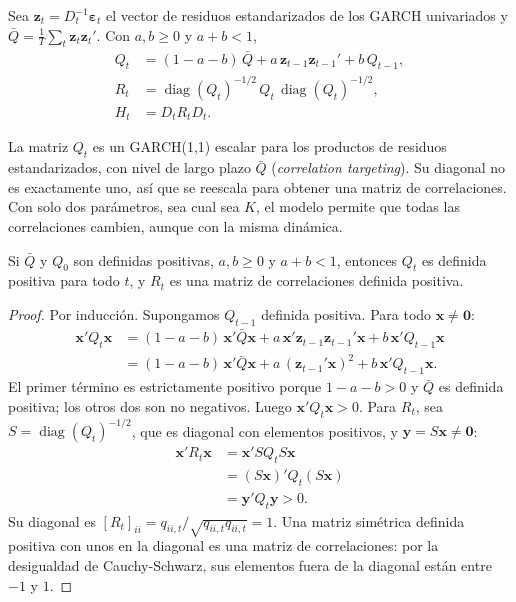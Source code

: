 \begin{definicion}
Sea $\mathbf z_t=D_t^{-1}\boldsymbol\varepsilon_t$ el vector de residuos estandarizados de los GARCH univariados
y $\bar Q=\frac1T\sum_t\mathbf z_t\mathbf z_t'$. Con $a,b\ge0$ y $a+b<1$,
\begin{align*}
  Q_t &= (1-a-b)\,\bar Q+a\,\mathbf z_{t-1}\mathbf z_{t-1}'+b\,Q_{t-1},\\
  R_t &= \operatorname{diag}(Q_t)^{-1/2}\,Q_t\,\operatorname{diag}(Q_t)^{-1/2},\\
  H_t &= D_tR_tD_t .
\end{align*}
\end{definicion}

La matriz $Q_t$ es un GARCH(1,1) escalar para los productos de residuos estandarizados, con nivel de largo plazo
$\bar Q$ (\emph{correlation targeting}). Su diagonal no es exactamente uno, así que se reescala para obtener una
matriz de correlaciones. Con solo dos parámetros, sea cual sea $K$, el modelo permite que todas las correlaciones
cambien, aunque con la misma dinámica.

\begin{proposicion}\label{prop:dccpd}
Si $\bar Q$ y $Q_0$ son definidas positivas, $a,b\ge0$ y $a+b<1$, entonces $Q_t$ es definida positiva para todo
$t$, y $R_t$ es una matriz de correlaciones definida positiva.
\end{proposicion}

\begin{proof}
Por inducción. Supongamos $Q_{t-1}$ definida positiva. Para todo $\mathbf x\ne\mathbf 0$:
\begin{align*}
  \mathbf x'Q_t\mathbf x &= (1-a-b)\,\mathbf x'\bar Q\mathbf x+a\,\mathbf x'\mathbf z_{t-1}\mathbf z_{t-1}'\mathbf x+b\,\mathbf x'Q_{t-1}\mathbf x\\
                         &= (1-a-b)\,\mathbf x'\bar Q\mathbf x+a\,(\mathbf z_{t-1}'\mathbf x)^2+b\,\mathbf x'Q_{t-1}\mathbf x .
\end{align*}
El primer término es estrictamente positivo porque $1-a-b>0$ y $\bar Q$ es definida positiva; los otros dos son
no negativos. Luego $\mathbf x'Q_t\mathbf x>0$. Para $R_t$, sea $S=\operatorname{diag}(Q_t)^{-1/2}$, que es diagonal
con elementos positivos, y $\mathbf y=S\mathbf x\ne\mathbf 0$:
\begin{align*}
  \mathbf x'R_t\mathbf x &= \mathbf x'SQ_tS\mathbf x\\
                         &= (S\mathbf x)'Q_t(S\mathbf x)\\
                         &= \mathbf y'Q_t\mathbf y>0 .
\end{align*}
Su diagonal es $[R_t]_{ii}=q_{ii,t}/\sqrt{q_{ii,t}q_{ii,t}}=1$. Una matriz simétrica definida positiva con unos
en la diagonal es una matriz de correlaciones: por la desigualdad de Cauchy-Schwarz, sus elementos fuera de la
diagonal están entre $-1$ y $1$.
\end{proof}

